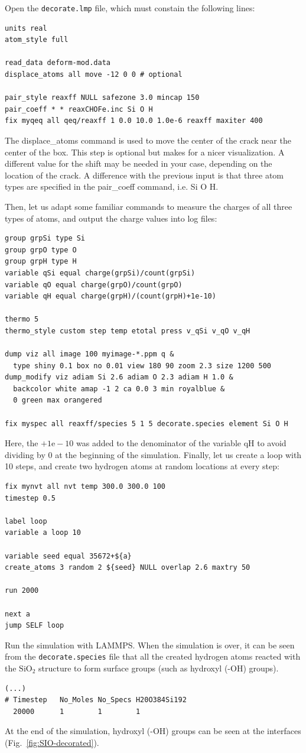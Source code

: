 \documentclass[9pt,tutorial]{livecoms}
\newcommand{\lmpcmd}[1]{\hspace{0pt}\colorbox{listing}{\textcolor{command}{\small{#1}}}\hspace{0pt}} %
\newcommand{\flecmd}[1]{\textcolor{command}{\texttt{#1}}} %
\begin{document}
Open the \flecmd{decorate.lmp} file, which must constain the following lines:
\begin{lstlisting}
units real
atom_style full

read_data deform-mod.data
displace_atoms all move -12 0 0 # optional

pair_style reaxff NULL safezone 3.0 mincap 150
pair_coeff * * reaxCHOFe.inc Si O H
fix myqeq all qeq/reaxff 1 0.0 10.0 1.0e-6 reaxff maxiter 400
\end{lstlisting}
The \lmpcmd{displace\_atoms} command is used to move the center of the
crack near the center of the box.  This step is optional but makes for a nicer
visualization.  A different value for the shift may be needed in
your case, depending on the location of the crack.  A difference with the previous
input is that three atom types are specified in the \lmpcmd{pair\_coeff} command, i.e.
\lmpcmd{Si O H}.

Then, let us adapt some familiar commands to measure the charges of all three
types of atoms, and output the charge values into log files:
\begin{lstlisting}
group grpSi type Si
group grpO type O
group grpH type H
variable qSi equal charge(grpSi)/count(grpSi)
variable qO equal charge(grpO)/count(grpO)
variable qH equal charge(grpH)/(count(grpH)+1e-10)

thermo 5
thermo_style custom step temp etotal press v_qSi v_qO v_qH

dump viz all image 100 myimage-*.ppm q &
  type shiny 0.1 box no 0.01 view 180 90 zoom 2.3 size 1200 500
dump_modify viz adiam Si 2.6 adiam O 2.3 adiam H 1.0 &
  backcolor white amap -1 2 ca 0.0 3 min royalblue &
  0 green max orangered

fix myspec all reaxff/species 5 1 5 decorate.species element Si O H
\end{lstlisting}
Here, the $+1\text{e}-10$ was added to the denominator of the \lmpcmd{variable qH}
to avoid dividing by 0 at the beginning of the simulation.  Finally, let us
create a loop with 10 steps, and create two hydrogen atoms at random locations at
every step:
\begin{lstlisting}
fix mynvt all nvt temp 300.0 300.0 100
timestep 0.5

label loop
variable a loop 10

variable seed equal 35672+${a}
create_atoms 3 random 2 ${seed} NULL overlap 2.6 maxtry 50

run 2000

next a
jump SELF loop
\end{lstlisting}
Run the simulation with LAMMPS.  When the simulation is over,
it can be seen from the \flecmd{decorate.species} file that
all the created hydrogen atoms reacted with the $\text{SiO}_{2}$ structure to
form surface groups (such as hydroxyl (-OH) groups).
\begin{lstlisting}
(...)
# Timestep   No_Moles No_Specs H20O384Si192
  20000      1        1        1
\end{lstlisting}
At the end of the simulation, hydroxyl (-OH) groups can be seen at the interfaces
(Fig.~\ref{fig:SIO-decorated}).
\end{document}
